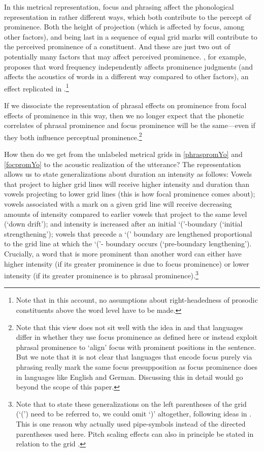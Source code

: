 \documentclass[preprint,review,12pt,authoryear,times]{elsarticle}
\begin{document}
In this metrical representation, focus and phrasing affect the phonological representation in rather different ways, which both contribute to the percept of prominence. Both the height of projection (which is affected by focus, among other factors), and being last in a sequence of equal grid marks will contribute to the perceived prominence of a constituent. And these are just two out of potentially many factors that may affect perceived prominence. \citet{cole10rapid}, for example, proposes that word frequency independently affects prominence judgments (and affects the acoustics of words in a different way compared to other factors), an effect replicated in \citet{bisho19}.\footnote{Note that in this account, no assumptions about right-headedness of prosodic constituents above the word level have to be made.}

If we dissociate the representation of phrasal effects on prominence from focal effects of prominence in this way, then we no longer expect  that the phonetic correlates of phrasal prominence and focus prominence will be the same---even if they both influence perceptual prominence.\footnote{Note that this view does not sit well with the idea in \citet{burin10} and \citet{fery13} that languages differ in whether they use focus prominence as defined here or instead exploit phrasal prominence to `align' focus with prominent positions in the sentence. But we note that it is not clear that languages that encode focus purely via phrasing really mark the same focus presupposition as focus prominence does in languages like English and German. Discussing this in detail would go beyond the scope of this paper.} 

How then do we get from the unlabeled metrical grids in \ref{phraspromYo} and  \ref{focpromYo} to the acoustic realization of the utterance? The representation allows us to state generalizations about duration an intensity as follows: Vowels that project to higher grid lines will receive higher intensity and duration than vowels projecting to lower grid lines (this is how focal prominence comes about); vowels associated with a mark on a given grid line will receive decreasing amounts of intensity compared to earlier vowels that project to the same level (`down drift'); and intensity is increased after an initial `('-boundary  (`initial strengthening'); vowels that precede a `(' boundary are lengthened proportional to the grid line at which the `('- boundary occurs (`pre-boundary lengthening'). Crucially, a word that is more prominent than another word can either have higher intensity (if its greater prominence is due to focus prominence) or lower intensity (if its greater prominence is to phrasal prominence).\footnote{ Note that to state these generalizations on the left parentheses of the grid (`(') need to be referred to, we could omit `)' altogether, following ideas in \citet{idsar92}. This is one reason why \citet{wagner05recursion} actually used pipe-symbols instead of the directed parentheses used here. Pitch scaling effects can also in principle be stated in relation to the grid \citep[see][140{\em ff }]{wagner05recursion}.} 
\end{document}
